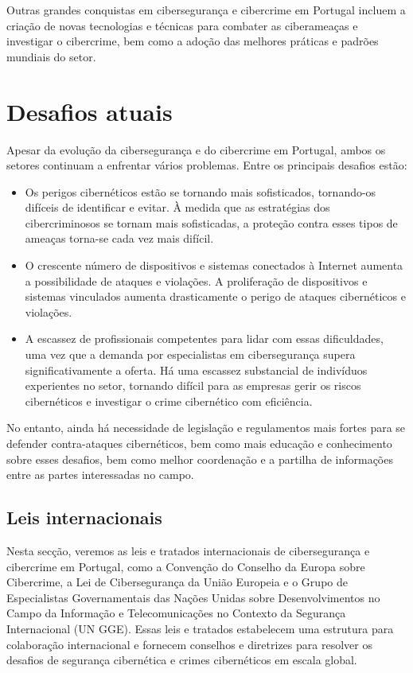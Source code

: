Outras grandes conquistas em cibersegurança e cibercrime em Portugal incluem a criação de novas tecnologias e técnicas para combater as ciberameaças e investigar o cibercrime, bem como a adoção das melhores práticas e padrões mundiais do setor.

\section{Desafios atuais}

Apesar da evolução da cibersegurança e do cibercrime em Portugal, ambos os setores continuam a enfrentar vários problemas. Entre os principais desafios estão:

\begin{itemize}
  \item Os perigos cibernéticos estão se tornando mais sofisticados, tornando-os difíceis de identificar e evitar. À medida que as estratégias dos cibercriminosos se tornam mais sofisticadas, a proteção contra esses tipos de ameaças torna-se cada vez mais difícil.
  \item O crescente número de dispositivos e sistemas conectados à Internet aumenta a possibilidade de ataques e violações. A proliferação de dispositivos e sistemas vinculados aumenta drasticamente o perigo de ataques cibernéticos e violações.
  \item A escassez de profissionais competentes para lidar com essas dificuldades, uma vez que a demanda por especialistas em cibersegurança supera significativamente a oferta. Há uma escassez substancial de indivíduos experientes no setor, tornando difícil para as empresas gerir os riscos cibernéticos e investigar o crime cibernético com eficiência.
\end{itemize}

No entanto, ainda há necessidade de legislação e regulamentos mais fortes para se defender contra-ataques cibernéticos, bem como mais educação e conhecimento sobre esses desafios, bem como melhor coordenação e a partilha de informações entre as partes interessadas no campo.

\subsection{Leis internacionais}

Nesta secção, veremos as leis e tratados internacionais de cibersegurança e cibercrime em Portugal, como a Convenção do Conselho da Europa sobre Cibercrime, a Lei de Cibersegurança da União Europeia e o Grupo de Especialistas Governamentais das Nações Unidas sobre Desenvolvimentos no Campo da Informação e Telecomunicações no Contexto da Segurança Internacional (UN GGE). Essas leis e tratados estabelecem uma estrutura para colaboração internacional e fornecem conselhos e diretrizes para resolver os desafios de segurança cibernética e crimes cibernéticos em escala global.

